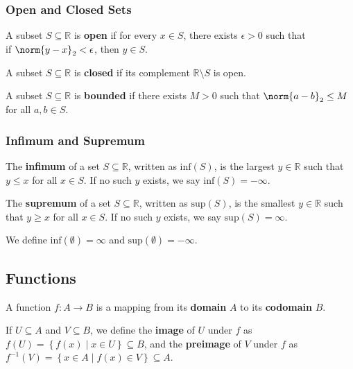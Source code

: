 \documentclass[11pt]{article}
\begin{document}
\subsubsection*{Open and Closed Sets}
A subset $S \subseteq \mathbb{R}$ is \textbf{open} if for every $x \in S$, there exists $\epsilon > 0$ such that \\
\-\quad if $\norm{y - x}_2 < \epsilon$, then $y \in S$. \par
A subset $S \subseteq \mathbb{R}$ is \textbf{closed} if its complement $\mathbb{R} \setminus S$ is open. \par
A subset $S \subseteq \mathbb{R}$ is \textbf{bounded} if there exists $M > 0$ such that $\norm{a-b}_2 \leq M$ for all $a, b \in S$. \par

\subsubsection*{Infimum and Supremum}
The \textbf{infimum} of a set $S \subseteq \mathbb{R}$, written as $\mathrm{inf}(S)$, is the largest $y \in \mathbb{R}$ such that $y \leq x$ for all $x \in S$. If no such $y$ exists, we say $\mathrm{inf}(S) = -\infty$. \par
The \textbf{supremum} of a set $S \subseteq \mathbb{R}$, written as $\mathrm{sup}(S)$, is the smallest $y \in \mathbb{R}$ such that $y \geq x$ for all $x \in S$. If no such $y$ exists, we say $\mathrm{sup}(S) = \infty$. \par
We define $\mathrm{inf}(\emptyset) = \infty$ and $\mathrm{sup}(\emptyset) = -\infty$. \par 

\subsection{Functions} 
A function $f: A \rightarrow B$ is a mapping from its \textbf{domain} $A$ to its \textbf{codomain} $B$. \par
If $U \subseteq A$ and $V \subseteq B$, we define the \textbf{image} of $U$ under $f$ as $f(U) = \left\{ f(x) \mid x \in U \right\} \subseteq B$, and the \textbf{preimage} of $V$ under $f$ as $f^{-1}(V) = \left\{ x \in A \mid f(x) \in V \right\} \subseteq A$. \par
\end{document}
